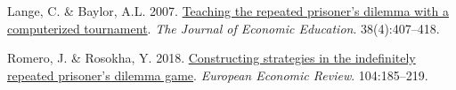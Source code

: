 \documentclass[11pt,preprint]{elsarticle}
\numberwithin{equation}{section}
\numberwithin{figure}{section}
\numberwithin{table}{section}
\newlength{\cslhangindent}
\newenvironment{CSLReferences}[2] %
{\begin{list}{}{%
	\setlength{\itemindent}{0pt}
	\setlength{\leftmargin}{0pt}
	\setlength{\parsep}{0pt}
	\ifodd #1
	\setlength{\leftmargin}{\cslhangindent}
	\setlength{\itemindent}{-1\cslhangindent}
	\fi
	\setlength{\itemsep}{#2\baselineskip}}}
{\end{list}}
\begin{document}
\begin{CSLReferences}{1}{0}
\leavevmode{}%
Lange, C. \& Baylor, A.L. 2007.
\href{https://doi.org/10.3200/JECE.38.4.407-418}{Teaching the repeated
prisoner's dilemma with a computerized tournament}. \emph{The Journal of
Economic Education}. 38(4):407--418.

\leavevmode{}%
Romero, J. \& Rosokha, Y. 2018.
\href{https://doi.org/10.1016/j.euroecorev.2018.02.008}{Constructing
strategies in the indefinitely repeated prisoner's dilemma game}.
\emph{European Economic Review}. 104:185--219.

\end{CSLReferences}


\end{document}
